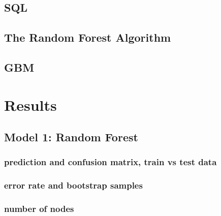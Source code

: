 \documentclass[11pt,preprint, authoryear]{elsarticle}
\numberwithin{equation}{section}
\numberwithin{figure}{section}
\numberwithin{table}{section}
\begin{document}
\hypertarget{sql}{%
\subsection*{SQL}\label{sql}}

\hypertarget{the-random-forest-algorithm}{%
\subsection*{The Random Forest
Algorithm}\label{the-random-forest-algorithm}}

\hypertarget{gbm}{%
\subsection*{GBM}\label{gbm}}

\hypertarget{results}{%
\section{Results}\label{results}}

\hypertarget{model-1-random-forest}{%
\subsection{Model 1: Random Forest}\label{model-1-random-forest}}

\hypertarget{prediction-and-confusion-matrix-train-vs-test-data}{%
\subsubsection*{prediction and confusion matrix, train vs test
data}\label{prediction-and-confusion-matrix-train-vs-test-data}}

\hypertarget{error-rate-and-bootstrap-samples}{%
\subsubsection*{error rate and bootstrap
samples}\label{error-rate-and-bootstrap-samples}}

\hypertarget{number-of-nodes}{%
\subsubsection*{number of nodes}\label{number-of-nodes}}
\end{document}
